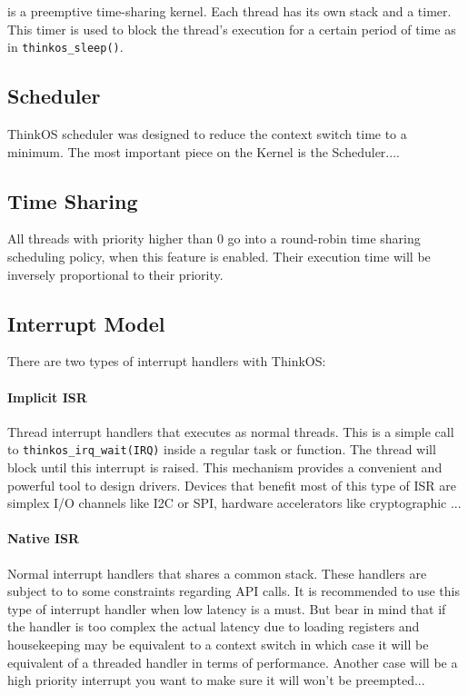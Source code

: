 \ThinkOS is a preemptive time-sharing kernel. Each thread has its own stack and a timer. This timer is used to block the thread's execution for a certain period of time as in \lstinline{thinkos_sleep()}.

\subsection{Scheduler}
ThinkOS scheduler was designed to reduce the context switch time to a minimum. The most important piece on the Kernel is the Scheduler....

\subsection{Time Sharing}
All threads with priority higher than 0 go into a round-robin time sharing scheduling policy, when this feature is enabled. Their execution time will be inversely proportional to their priority.

\subsection{Interrupt Model}
There are two types of interrupt handlers with ThinkOS:

\paragraph{Implicit ISR}{Thread interrupt handlers that executes as normal threads. This is a simple call to \lstinline{thinkos_irq_wait(IRQ)} inside a regular task or function. The thread will block until this interrupt is raised. This mechanism provides a convenient and powerful tool to design drivers. Devices that benefit most of this type of ISR are simplex I/O channels like I2C or SPI, hardware accelerators like cryptographic ...}

\paragraph{Native ISR}{Normal interrupt handlers that shares a common stack. These handlers are subject to to some constraints regarding API calls. It is recommended to use this type of interrupt handler when low latency is a must. But bear in mind that if the handler is too complex the actual latency due to loading registers and housekeeping may be equivalent to a context switch in which case it will be equivalent of a threaded handler in terms of performance. Another case will be a high priority interrupt you want to make sure it will won't be preempted...}


